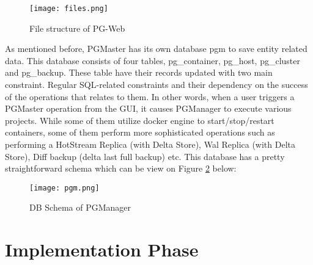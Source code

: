 \begin{figure}
    \centering
    \texttt{[image: files.png]}
    \caption{File structure of PG-Web}
    \label{fig:files}
\end{figure}

\par
As mentioned before, PGMaster has its own database pgm to save entity 
related data. This database consists of four tables, pg_container, pg_host,
pg_cluster and pg_backup. These table have their records updated with two 
main constraint. Regular SQL-related constraints and their dependency on 
the success of the operations that relates to them. In other words, when a 
user triggers a PGMaster operation from the GUI, it causes PGManager to 
execute various projects. While some of them utilize docker engine to 
start/stop/restart containers, some of them perform more sophisticated 
operations such as performing a HotStream Replica (with Delta Store), Wal 
Replica (with Delta Store), Diff backup (delta last full backup) etc. This 
database has a pretty straightforward schema which can be view on Figure 
\ref{fig:schema} below:

\begin{figure}
    \centering
    \texttt{[image: pgm.png]}
    \caption{DB Schema of PGManager}
    \label{fig:schema}
\end{figure}

\section{Implementation Phase}
